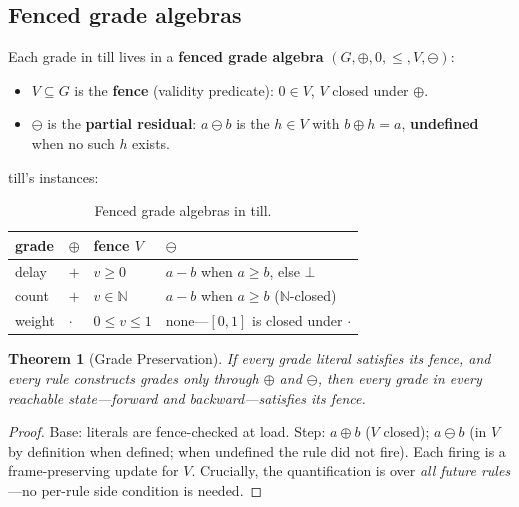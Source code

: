 \documentclass[11pt]{article}
\newcommand{\N}{\mathbb{N}}
\newcommand{\res}{\ominus}
\newtheorem{theorem}{Theorem}[section]
\theoremstyle{remark}
\begin{document}
\subsection{Fenced grade algebras}
\label{sec:fenced-grades}

Each grade in till lives in a \textbf{fenced grade algebra}
$(G, \oplus, 0, \leq, V, \res)$:

\begin{itemize}
\item $V \subseteq G$ is the \textbf{fence} (validity predicate): $0 \in V$, $V$
  closed under $\oplus$.
\item $\res$ is the \textbf{partial residual}: $a \res b$ is the $h \in V$ with
  $b \oplus h = a$, \textbf{undefined} when no such $h$ exists.
\end{itemize}

till's instances:

\begin{table}[ht]
\centering
\begin{tabular}{@{}llll@{}}
\toprule
grade  & $\oplus$ & fence $V$         & $\res$ \\
\midrule
delay  & $+$ & $v \geq 0$            & $a - b$ when $a \geq b$, else $\bot$ \\
count  & $+$ & $v \in \N$            & $a - b$ when $a \geq b$ ($\N$-closed) \\
weight & $\cdot$ & $0 \leq v \leq 1$ & none---$[0,1]$ is closed under $\cdot$ \\
\bottomrule
\end{tabular}
\caption{Fenced grade algebras in till.}
\label{tab:grades}
\end{table}

\begin{theorem}[Grade Preservation]
\label{thm:grade-pres}
If every grade literal satisfies its fence, and every rule constructs grades only
through $\oplus$ and $\res$, then every grade in every reachable state---forward
and backward---satisfies its fence.
\end{theorem}

\begin{proof}
Base: literals are fence-checked at load.  Step: $a \oplus b$ ($V$ closed);
$a \res b$ (in $V$ by definition when defined; when undefined the rule did not
fire).  Each firing is a frame-preserving update for $V$.  Crucially, the
quantification is over \emph{all future rules}---no per-rule side condition is
needed.
\end{proof}
\end{document}
